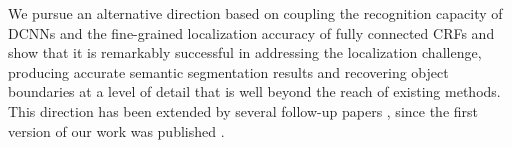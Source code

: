 
We pursue an alternative direction based on coupling the recognition
capacity of DCNNs and the fine-grained localization accuracy of fully connected
CRFs and show that it is remarkably successful in addressing the localization
challenge, producing accurate semantic segmentation results and recovering
object boundaries at a level of detail that is well beyond the reach of existing
methods. This direction has been extended by several follow-up papers
\cite{papandreou2015weakly, schwing2015fully, zheng2015conditional,
  dai2015boxsup, noh2015learning, liu2015semantic, lin2015efficient,
  chen2015attention, chen2015semantic}, since the first version of our work
was published \cite{chen2014semantic}.

